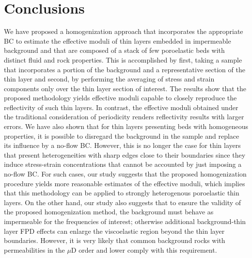 \documentclass[draft]{agujournal2019}
\begin{document}


\section{Conclusions}
We have proposed a homogenization approach that incorporates the appropriate BC to estimate the effective moduli of thin layers embedded in impermeable background and that are composed of a stack of few poroelastic beds with distinct fluid and rock properties. This is accomplished by first, taking a sample that incorporates a portion of the background and a representative section of the thin layer and second, by performing the averaging of stress and strain components only over the thin layer section of interest.
The results show that the proposed methodology yields effective moduli capable to closely reproduce the reflectivity of such thin layers. In contrast, the effective moduli obtained under the traditional consideration of periodicity renders reflectivity results with larger errors. We  have also shown that for thin layers presenting beds with homogeneous properties, it is possible to disregard the background in the sample and replace its influence by a no-flow BC. However, this is no longer the case for thin layers that present heterogeneities with sharp edges close to their boundaries since they induce stress-strain concentrations that cannot be accounted by just imposing a no-flow BC. For such cases, our study suggests that the proposed homogenization procedure yields more reasonable estimates of the effective moduli, which implies that this methodology can be applied to strongly heterogenous poroelastic thin layers. On the other hand, our study also suggests that to ensure the validity of the proposed homogenization method, the background must behave as impermeable for the frequencies of interest; otherwise additional background-thin layer FPD effects can enlarge the viscoelastic region beyond the thin layer boundaries. However, it is very likely that common background rocks with permeabilities in the $\mu$D order and lower comply with this requirement.
\end{document}

